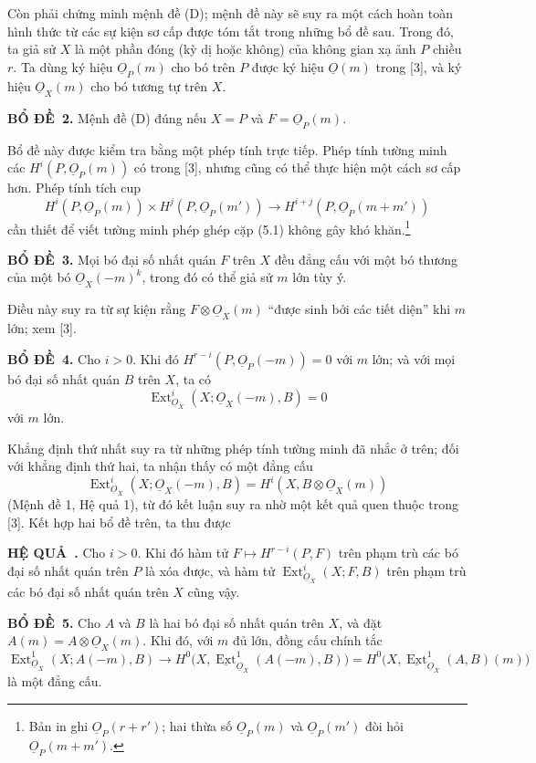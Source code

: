 \documentclass[11pt,twoside,openany]{book}
\numberwithin{equation}{section}
\newcommand{\src}[1]{%
  \phantomsection\hypertarget{src:\fgasourceid:#1}{}%
  \marginpar{\raggedleft\footnotesize\sffamily #1}%
}
\newcommand{\fgasourceid}{unset}
\newcommand{\Osh}{\underline{O}}
\newcommand{\Extsh}{\underline{\operatorname{Ext}}}
\newcommand{\result}[2]{\par\medskip\noindent\textbf{#1\if\relax\detokenize{#2}\relax\else\ #2\fi.}\quad}
\begin{document}
Còn phải chứng minh mệnh đề (D); mệnh đề này sẽ suy ra một cách hoàn toàn hình
thức từ các sự kiện sơ cấp được tóm tắt trong những bổ đề sau. Trong đó, ta giả
sử $X$ là một phần đóng (kỳ dị hoặc không) của không gian xạ ảnh $P$ chiều
$r$. Ta dùng ký hiệu $\Osh_P(m)$ cho bó trên $P$ được ký hiệu $\Osh(m)$ trong
[3], và ký hiệu $\Osh_X(m)$ cho bó tương tự trên $X$.

\result{BỔ ĐỀ}{2} Mệnh đề (D) đúng nếu $X=P$ và $F=\Osh_P(m)$.

Bổ đề này được kiểm tra bằng một phép tính trực tiếp. Phép tính tường minh các
$H^{i}(P,\Osh_P(m))$ có trong [3], nhưng cũng có thể thực hiện một cách sơ cấp
hơn. Phép tính tích cup
\[
  H^{i}(P,\Osh_P(m))\times H^{j}(P,\Osh_P(m'))
  \longrightarrow H^{i+j}(P,\Osh_P(m+m'))
\]
cần thiết để viết tường minh phép ghép cặp (5.1) không gây khó
khăn.\footnote{Bản in ghi $\Osh_P(r+r')$; hai thừa số
$\Osh_P(m)$ và $\Osh_P(m')$ đòi hỏi $\Osh_P(m+m')$.}

\result{BỔ ĐỀ}{3} Mọi bó đại số nhất quán $F$ trên $X$ đều đẳng cấu với một
bó thương của một bó $\Osh_X(-m)^{k}$, trong đó có thể giả sử $m$ lớn tùy ý.

Điều này suy ra từ sự kiện rằng $F\otimes\Osh_X(m)$ ``được sinh bởi các tiết
diện'' khi $m$ lớn; xem [3].

\result{BỔ ĐỀ}{4} Cho $i>0$. Khi đó
$H^{r-i}(P,\Osh_P(-m))=0$ với $m$ lớn; và với mọi bó đại số nhất quán $B$
trên $X$, ta có
\[
  \operatorname{Ext}_{\Osh_X}^{i}(X;\Osh_X(-m),B)=0
\]
với $m$ lớn.

Khẳng định thứ nhất suy ra từ những phép tính tường minh đã nhắc ở trên; đối
với khẳng định thứ hai, ta nhận thấy có một đẳng cấu
\[
  \operatorname{Ext}_{\Osh_X}^{i}(X;\Osh_X(-m),B)
  =H^{i}(X,B\otimes\Osh_X(m))
\]
(Mệnh đề 1, Hệ quả 1), từ đó kết luận suy ra nhờ một kết quả quen thuộc trong
[3]. Kết hợp hai bổ đề trên, ta thu được

\result{HỆ QUẢ}{} Cho $i>0$. Khi đó hàm tử
$F\longmapsto H^{r-i}(P,F)$ trên phạm trù các bó đại số nhất quán trên $P$
là xóa được, và hàm tử
$\operatorname{Ext}_{\Osh_X}^{i}(X;F,B)$ trên phạm trù các bó đại số nhất quán
trên $X$ cũng vậy.

\src{184}
\result{BỔ ĐỀ}{5} Cho $A$ và $B$ là hai bó đại số nhất quán trên
$X$, và đặt $A(m)=A\otimes\Osh_X(m)$. Khi đó, với $m$ đủ lớn,
đồng cấu chính tắc
\[
  \operatorname{Ext}_{\Osh_X}^{1}(X;A(-m),B)
  \longrightarrow H^{0}\bigl(X,\Extsh_{\Osh_X}^{1}(A(-m),B)\bigr)
  =H^{0}\bigl(X,\Extsh_{\Osh_X}^{1}(A,B)(m)\bigr)
\]
là một đẳng cấu.
\end{document}
